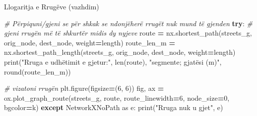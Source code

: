 \documentclass[
  ignorenonframetext,
]{beamer}
\newenvironment{Shaded}{\begin{snugshade}}{\end{snugshade}}
\newcommand{\BuiltInTok}[1]{#1}
\newcommand{\CommentTok}[1]{\textcolor[rgb]{0.56,0.35,0.01}{\textit{#1}}}
\newcommand{\ControlFlowTok}[1]{\textcolor[rgb]{0.13,0.29,0.53}{\textbf{#1}}}
\newcommand{\DecValTok}[1]{\textcolor[rgb]{0.00,0.00,0.81}{#1}}
\newcommand{\ImportTok}[1]{#1}
\newcommand{\NormalTok}[1]{#1}
\newcommand{\OperatorTok}[1]{\textcolor[rgb]{0.81,0.36,0.00}{\textbf{#1}}}
\newcommand{\StringTok}[1]{\textcolor[rgb]{0.31,0.60,0.02}{#1}}
\begin{document}
\begin{frame}[fragile]{Llogaritja e Rrugëve (vazhdim)}
\protect\hypertarget{llogaritja-e-rruguxebve-vazhdim}{}

\begin{Shaded}
\begin{Highlighting}[]
\CommentTok{\# Përpiquni/gjeni se për shkak se ndonjëherë rrugët nuk mund të gjenden}
\ControlFlowTok{try}\NormalTok{:}
    \CommentTok{\# gjeni rrugën më të shkurtër midis dy nyjeve}
\NormalTok{    route }\OperatorTok{=}\NormalTok{ nx.shortest\_path(streets\_g, orig\_node, dest\_node, weight}\OperatorTok{=}\StringTok{\textquotesingle{}length\textquotesingle{}}\NormalTok{)}
\NormalTok{    route\_len\_m }\OperatorTok{=}\NormalTok{ nx.shortest\_path\_length(streets\_g, orig\_node, dest\_node, weight}\OperatorTok{=}\StringTok{\textquotesingle{}length\textquotesingle{}}\NormalTok{)}
    \BuiltInTok{print}\NormalTok{(}\StringTok{"Rruga e udhëtimit e gjetur:"}\NormalTok{, }\BuiltInTok{len}\NormalTok{(route), }\StringTok{"segmente; gjatësi (m)"}\NormalTok{, }\BuiltInTok{round}\NormalTok{(route\_len\_m))}
    
    \CommentTok{\# vizatoni rrugën}
\NormalTok{    plt.figure(figsize}\OperatorTok{=}\NormalTok{(}\DecValTok{6}\NormalTok{, }\DecValTok{6}\NormalTok{))}
\NormalTok{    fig, ax }\OperatorTok{=}\NormalTok{ ox.plot\_graph\_route(streets\_g, route, route\_linewidth}\OperatorTok{=}\DecValTok{6}\NormalTok{, node\_size}\OperatorTok{=}\DecValTok{0}\NormalTok{, bgcolor}\OperatorTok{=}\StringTok{\textquotesingle{}k\textquotesingle{}}\NormalTok{)}
\ControlFlowTok{except}\NormalTok{ NetworkXNoPath }\ImportTok{as}\NormalTok{ e: }
    \BuiltInTok{print}\NormalTok{(}\StringTok{"Rruga nuk u gjet"}\NormalTok{, e)}
\end{Highlighting}
\end{Shaded}
\end{frame}
\end{document}
